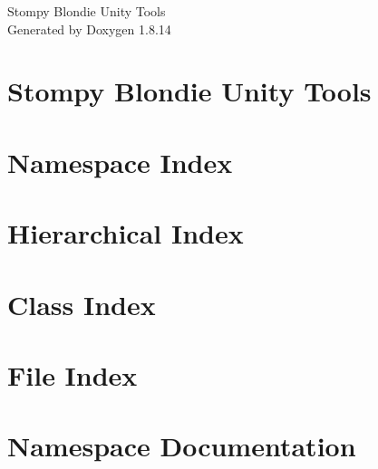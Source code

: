 \documentclass[twoside]{book}
\newcommand{\+}{\discretionary{\mbox{\scriptsize$\hookleftarrow$}}{}{}}
\newcommand{\clearemptydoublepage}{%
  \newpage{\pagestyle{empty}\cleardoublepage}%
}
\begin{document}
\hypersetup{pageanchor=false,
             bookmarksnumbered=true,
             pdfencoding=unicode
            }
\begin{titlepage}
\vspace*{7cm}
\begin{center}%
{\Large Stompy Blondie Unity Tools }\\
\vspace*{1cm}
{\large Generated by Doxygen 1.8.14}\\
\end{center}
\end{titlepage}
\clearemptydoublepage
{}
\tableofcontents
\clearemptydoublepage
{}
\hypersetup{pageanchor=true}

\chapter{Stompy Blondie Unity Tools}
\label{md__r_e_a_d_m_e}

\chapter{Namespace Index}

\chapter{Hierarchical Index}

\chapter{Class Index}

\chapter{File Index}

\chapter{Namespace Documentation}










\end{document}
